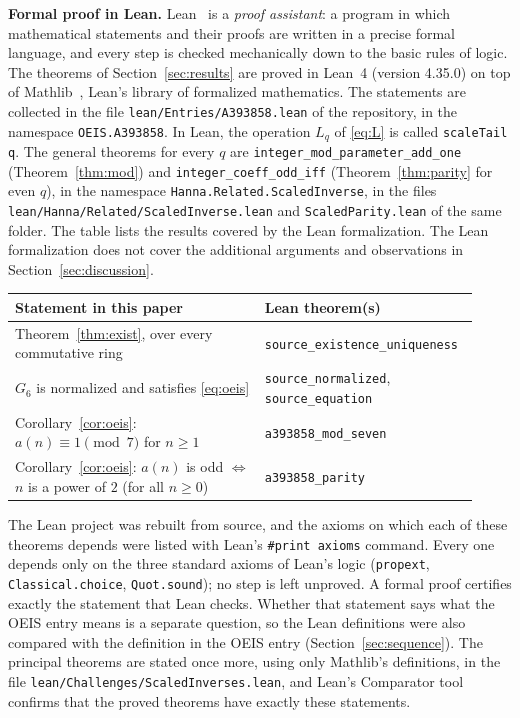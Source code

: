\documentclass[11pt,a4paper]{article}
\theoremstyle{definition}
\theoremstyle{remark}
\newcommand{\para}[1]{\par\medskip\noindent\textbf{#1}\enspace}
\begin{document}
\para{Formal proof in Lean.}
Lean~\cite{lean} is a \emph{proof assistant}: a program in which mathematical statements and their proofs are written
in a precise formal language, and every step is checked mechanically down to the basic rules of logic. The theorems of Section~\ref{sec:results} are proved in Lean~4 (version 4.35.0) on top of
Mathlib~\cite{mathlib}, Lean's library of formalized mathematics. The statements are collected in the file \texttt{lean/Entries/A393858.lean} of the repository,
in the namespace \texttt{OEIS.A393858}. In Lean, the operation $L_q$ of \eqref{eq:L} is called \texttt{scaleTail q}. The general theorems for every $q$ are \texttt{integer\_mod\_parameter\_add\_one} (Theorem~\ref{thm:mod}) and \texttt{integer\_coeff\_odd\_iff} (Theorem~\ref{thm:parity} for even $q$), in the namespace \texttt{Hanna.\allowbreak Related.\allowbreak ScaledInverse}, in the files \texttt{lean/\allowbreak Hanna/\allowbreak Related/\allowbreak ScaledInverse.lean} and \texttt{ScaledParity.lean} of the same folder.
The table lists the results covered by the Lean formalization. The Lean formalization does not cover the additional arguments and observations in Section~\ref{sec:discussion}.
\begin{center}\small\renewcommand{\arraystretch}{1.25}
\begin{tabular}{>{\raggedright\arraybackslash}p{0.52\linewidth}>{\raggedright\arraybackslash}p{0.4\linewidth}}
\toprule
Statement in this paper & Lean theorem(s)\\
\midrule
Theorem~\ref{thm:exist}, over every commutative ring & \texttt{source\_\allowbreak{}existence\_\allowbreak{}uniqueness} \\
$G_{6}$ is normalized and satisfies \eqref{eq:oeis} & \texttt{source\_\allowbreak{}normalized}, \texttt{source\_\allowbreak{}equation} \\
Corollary~\ref{cor:oeis}: $a(n)\equiv1\pmod{7}$ for $n\ge1$ & \texttt{a393858\_\allowbreak{}mod\_\allowbreak{}seven} \\
Corollary~\ref{cor:oeis}: $a(n)$ is odd $\iff$ $n$ is a power of $2$ (for all $n\ge0$) & \texttt{a393858\_\allowbreak{}parity} \\
\bottomrule
\end{tabular}
\end{center}
The Lean project was rebuilt from source, and the axioms on which each of these theorems depends were listed with
Lean's \texttt{\#print axioms} command. Every one depends only on the three standard axioms of Lean's logic
(\texttt{propext}, \texttt{Classical.choice}, \texttt{Quot.sound}); no step is left unproved. A formal proof certifies
exactly the statement that Lean checks. Whether that statement says what the OEIS entry means is a separate question,
so the Lean definitions were also compared with the definition in the OEIS entry
(Section~\ref{sec:sequence}). The principal theorems are stated once more, using only Mathlib's definitions, in the
file \texttt{lean/Challenges/ScaledInverses.lean}, and Lean's Comparator tool confirms that the
proved theorems have exactly these statements.
\end{document}
